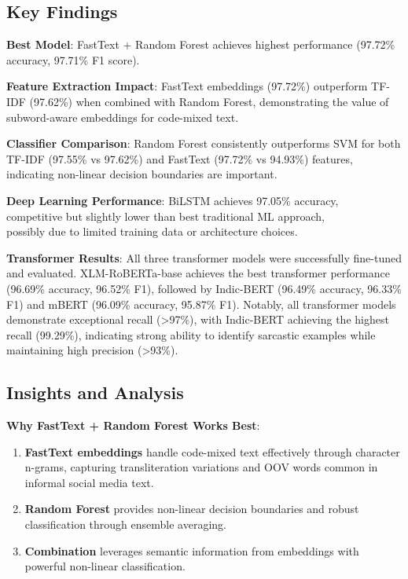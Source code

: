 \documentclass[11pt]{article}
\begin{document}
\subsection{Key Findings}

\textbf{Best Model}: FastText + Random Forest achieves highest performance (97.72\% accuracy, 97.71\% F1 score).

\textbf{Feature Extraction Impact}: FastText embeddings (97.72\%) outperform TF-IDF (97.62\%) when combined with Random Forest, demonstrating the value of subword-aware embeddings for code-mixed text.

\textbf{Classifier Comparison}: Random Forest consistently outperforms SVM for both TF-IDF (97.55\% vs 97.62\%) and FastText (97.72\% vs 94.93\%) features, indicating non-linear decision boundaries are important.

\textbf{Deep Learning Performance}: BiLSTM achieves 97.05\% accuracy,\\ competitive but slightly lower than best traditional ML approach,\\ possibly due to limited training data or architecture choices.

\textbf{Transformer Results}: All three transformer models were successfully fine-tuned and evaluated. XLM-RoBERTa-base achieves the best transformer performance (96.69\% accuracy, 96.52\% F1), followed by Indic-BERT (96.49\% accuracy, 96.33\% F1) and mBERT (96.09\% accuracy, 95.87\% F1). Notably, all transformer models demonstrate exceptional recall (>97\%), with Indic-BERT achieving the highest recall (99.29\%), indicating strong ability to identify sarcastic examples while maintaining high precision (>93\%).

\subsection{Insights and Analysis}

\textbf{Why FastText + Random Forest Works Best}:
\begin{enumerate}
\item \textbf{FastText embeddings} handle code-mixed text effectively through character n-grams, capturing transliteration variations and OOV words common in informal social media text.
\item \textbf{Random Forest} provides non-linear decision boundaries and robust classification through ensemble averaging.
\item \textbf{Combination} leverages semantic information from embeddings with powerful non-linear classification.
\end{enumerate}
\end{document}

